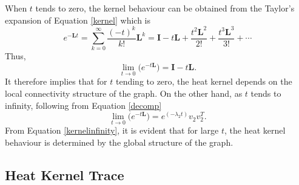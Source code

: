 \documentclass[10pt,a4paper]{article}
\begin{document}
        When $t$ tends to zero, the kernel behaviour can be obtained from the Taylor's expansion of  Equation \ref{kernel} which is 
        \begin{equation}
        e^{-\mathbf{L}t} = \sum_{k=0}^{\infty} \frac{(-t)^k}{k!} \mathbf{L}^k = \mathbf{I} -t \mathbf{L} + \frac{ t^2 \mathbf{L}^2}{2!} + \frac{ t^3 \mathbf{L}^3}{3!}+ \cdots
        \end{equation}
        Thus,
        \begin{equation}
        \lim_{t\longrightarrow 0} \Big(e^{-t\mathbf{L}}\Big) = \mathbf{I} - t\mathbf{L}.
        \label{kerneltozero}
        \end{equation}
        It therefore implies that for $t$ tending to zero, the heat kernel depends on the local connectivity structure of the graph.
        On the other hand, as $t$ tends to infinity, following from Equation \ref{decomp}
        \begin{equation}
        \lim_{t\longrightarrow 0} \Big(e^{-t\mathbf{L}}\Big) = e^{(-\lambda_2 t)} v_2 v _2^T.
        \label{kernelinfinity}  
        \end{equation}
        From Equation \ref{kernelinfinity}, it is evident that for large $t$, the heat kernel behaviour is determined by the global structure of the graph. 
        
        \subsection{Heat Kernel Trace}
        
\end{document}
